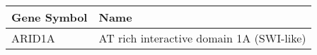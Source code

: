 \begin{tabular}{ll}
\toprule
Gene Symbol &                                     Name \\
\midrule
     ARID1A & AT rich interactive domain 1A (SWI-like) \\
\bottomrule
\end{tabular}
